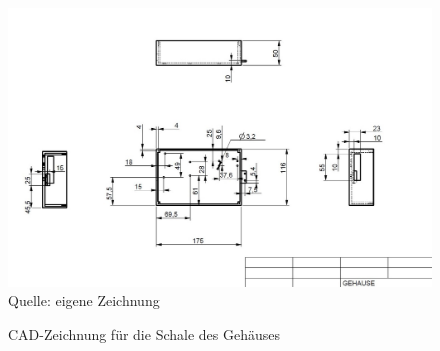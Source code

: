 \begin{figure}[!hbt]
	\centering
	\includegraphics[width=0.9\linewidth]{Images/CAD-Schale}
	\footnotesize \\Quelle: eigene Zeichnung
	\caption{\ac{CAD}-Zeichnung für die Schale des Gehäuses}
	\label{fig:Zeichnung_Schale}
\end{figure}


